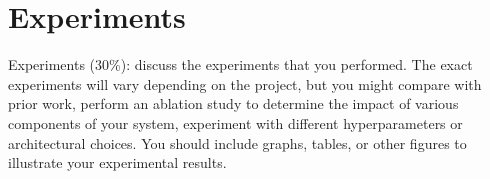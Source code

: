 \section{Experiments}
Experiments (30\%): discuss the experiments that you performed. The exact experiments will vary
depending on the project, but you might compare with prior work, perform an ablation study to
determine the impact of various components of your system, experiment with different hyperparameters
or architectural choices. You should include graphs, tables, or other figures to illustrate your experimental results.





